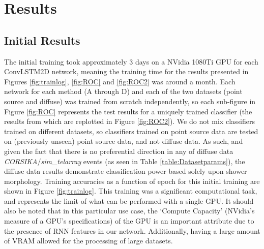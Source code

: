 \section{Results} \label{Results}
\subsection{Initial Results}
 The initial training took approximately 3 days on a NVidia 1080Ti GPU for each ConvLSTM2D network, meaning the training time for the results presented in Figures \ref{fig:trainlog}, \ref{fig:ROC} and \ref{fig:ROC2} was around a month. Each network for each method (A through D) and each of the two datasets (point source and diffuse) was trained from scratch independently, so each sub-figure in Figure \ref{fig:ROC} represents the test results for a uniquely trained classifier (the results from which are re\-plotted in Figure \ref{fig:ROC2}). We do not mix classifiers trained on different datasets, so classifiers trained on point source data are tested on (previously unseen) point source data, and not diffuse data. As such, and given the fact that there is no preferential direction in any of diffuse data \textit{CORSIKA}/\textit{sim\_telarray} events (as seen in Table \ref{table:Datasetparams}), the diffuse data results demonstrate classification power based solely upon shower morphology. Training accuracies as a function of epoch for this initial training are shown in Figure \ref{fig:trainlog}. This training was a significant computational task, and represents the limit of what can be performed with a single GPU. It should also be noted that in this particular use case, the `Compute Capacity' (NVidia's measure of a GPU's specifications) of the GPU is an important attribute due to the presence of RNN features in our network. Additionally, having a large amount of VRAM allowed for the processing of large datasets.
 
